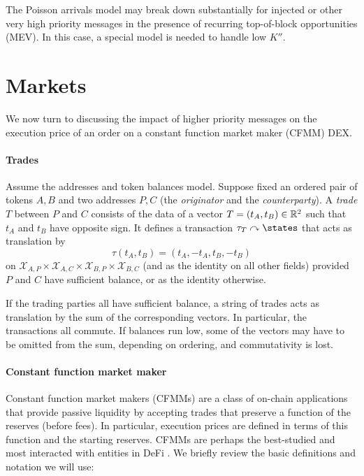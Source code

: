\documentclass[a4paper,11pt]{article}
\begin{document}
\begin{remark}

  The Poisson arrivals model may break down substantially for injected or other very high priority messages in the presence of recurring top-of-block opportunities (MEV).
  In this case, a special model is needed to handle low $K''$.

\end{remark}

\section{Markets}
\label{markets}

We now turn to discussing the impact of higher priority messages on the execution price of an order on a constant function market maker (CFMM) DEX.


\paragraph{Trades}

Assume the addresses and token balances model. Suppose fixed an ordered pair of tokens $A,B$ and two addresses $P,C$ (the \emph{originator} and the \emph{counterparty}).
%
A \emph{trade} $T$ between $P$ and $C$ consists of the data of a vector $T = (t_A,t_B)\in \mathbb R^2$ such that $t_A$ and $t_B$ have opposite sign.
%
It defines a transaction $\tau_T\curvearrowright \states$ that acts as translation by 
\[ \tau(t_A,t_B) = (t_A,-t_A,t_B,-t_B) \]
on $\mathcal{X}_{A,P}\times\mathcal{X}_{A,C}\times\mathcal{X}_{B,P}\times\mathcal{X}_{B,C}$ (and as the identity on all other fields) provided $P$ and $C$ have sufficient balance, or as the identity otherwise.

If the trading parties all have sufficient balance, a string of trades acts as translation by the sum of the corresponding vectors.
%
In particular, the transactions all commute.
%
If balances run low, some of the vectors may have to be omitted from the sum, depending on ordering, and commutativity is lost.


\paragraph{Constant function market maker} Constant function market makers (CFMMs) are a class of on-chain applications that provide passive liquidity by accepting trades that preserve a function of the reserves (before fees).
%
In particular, execution prices are defined in terms of this function and the starting reserves.
%
CFMMs are perhaps the best-studied and most interacted with entities in DeFi \cite{angeris2020improved, angeris2022constant, xu2022sok,kulkarni2022towards}. We briefly review the basic definitions and notation we will use:
\end{document}
